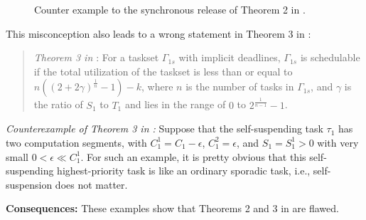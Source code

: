 \begin{figure}[t]
{}     
  \caption{Counter example to the synchronous release of Theorem 2 in \cite{RTSS-KimANR13}.}
  \label{fig:counterexample-reduce-interf}
\end{figure}

This misconception also leads to a wrong statement in Theorem 3 in \cite{RTSS-KimANR13}:
\begin{quote}
{\it Theorem 3 in \cite{RTSS-KimANR13}}: For a taskset $\Gamma_{1s}$ with implicit deadlines, $\Gamma_{1s}$ is schedulable if the total utilization of the taskset is less than or equal to $n((2+2\gamma)^{\frac{1}{n}}-1)-k$, where $n$ is the number of tasks in $\Gamma_{1s}$, and $\gamma$ is the ratio of
$S_1$ to $T_1$ and lies in the range of $0$ to $2^{\frac{1}{n-1}}-1$. 
\end{quote}


{\it Counterexample of Theorem 3 in \cite{RTSS-KimANR13}:} Suppose that the self-suspending task $\tau_1$ has two computation segments, with $C_1^1 = C_1-\epsilon$, $C_1^2 = \epsilon$, and $S_1=S_1^1 > 0$ with very small $0 < \epsilon \ll C_1^1$. For such an example, it is pretty obvious that this self-suspending highest-priority task is like an ordinary sporadic task, i.e., self-suspension does not matter. 

{\bf Consequences:} These examples show that Theorems 2 and 3 in \cite{RTSS-KimANR13} are flawed.  

